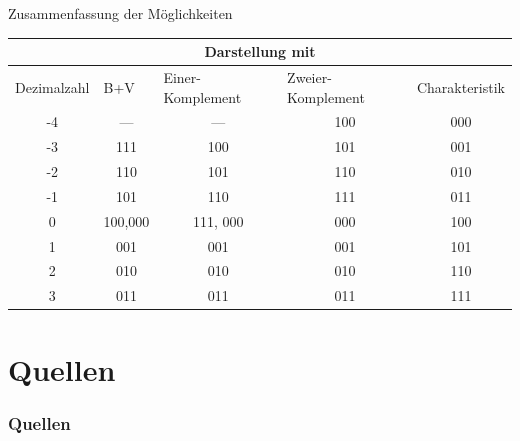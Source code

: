 \documentclass[12pt%
,aspectratio=169%
]{beamer}
\begin{document}
\begin{frame}{Zusammenfassung der Möglichkeiten}
\begin{table}[]
\begin{tabular}{|c|c|c|c|c|}
\hline
\multicolumn{5}{|c|}{Darstellung mit}                                                                            \\ \hline
\multicolumn{1}{|l|}{Dezimalzahl} & \multicolumn{1}{l|}{B+V} & \multicolumn{1}{l|}{Einer-Komplement} & \multicolumn{1}{l|}{Zweier-Komplement} & Charakteristik \\ \hline
-4 & --- & --- & 100 & 000 \\ \hline
-3 & 111 & 100 & 101 & 001 \\ \hline
-2 & 110 & 101 & 110 & 010 \\ \hline
-1 & 101 & 110 & 111 & 011 \\ \hline
 0 & 100,000 &111, 000 & 000 & 100 \\ \hline
 1 & 001 & 001 & 001 & 101 \\ \hline
 2 & 010 & 010 & 010 & 110 \\ \hline
 3 & 011 & 011 & 011 & 111 \\ \hline
\end{tabular}
\end{table}
\end{frame}


\section*{Quellen}
\appendix
\begin{frame}[allowframebreaks]
  \frametitle<presentation>{Quellen}
\printbibliography
\end{frame}
\end{document}
